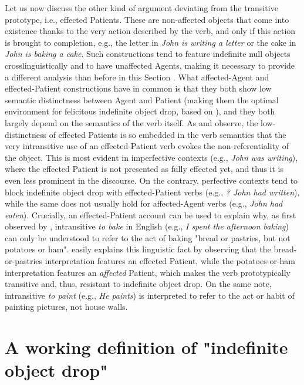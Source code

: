 Let us now discuss the other kind of argument deviating from the transitive prototype, i.e., effected Patients. These are non-affected objects that come into existence thanks to the very action described by the verb, and only if this action is brought to completion, e.g., the letter in \textit{John is writing a letter} or the cake in \textit{John is baking a cake}. Such constructions tend to feature indefinite null objects crosslinguistically and to have unaffected Agents, making it necessary to provide a different analysis than before in this Section \parencite[127-128]{Naess2007}. What affected-Agent and effected-Patient constructions have in common is that they both show low semantic distinctness between Agent and Patient (making them the optimal environment for felicitous indefinite object drop, based on \textcite{HopperThompson1980}), and they both largely depend on the semantics of the verb itself. As \textcite[127]{Naess2007} and \textcite[421]{Naess2011} observe, the low-distinctness of effected Patients is so embedded in the verb semantics that the very intransitive use of an effected-Patient verb evokes the non-referentiality of the object. This is most evident in imperfective contexts (e.g., \textit{John was writing}), where the effected Patient is not presented as fully effected yet, and thus it is even less prominent in the discourse. On the contrary, perfective contexts tend to block indefinite object drop with effected-Patient verbs (e.g., \textit{? John had written}), while the same does not usually hold for affected-Agent verbs (e.g., \textit{John had eaten}). Crucially, an effected-Patient account can be used to explain why, as first observed by \textcite[96]{Fillmore1986}, intransitive \textit{to bake} in English (e.g., \textit{I spent the afternoon baking}) can only be understood to refer to the act of baking "bread or pastries, but not potatoes or ham". \textcite[135]{Naess2007} easily explains this linguistic fact by observing that the bread-or-pastries interpretation features an effected Patient, while the potatoes-or-ham interpretation features an \textit{affected} Patient, which makes the verb prototypically transitive and, thus, resistant to indefinite object drop. On the same note, intransitive \textit{to paint} (e.g., \textit{He paints}) is interpreted to refer to the act or habit of painting pictures, not house walls.


\section{A working definition of "indefinite object drop"} 

